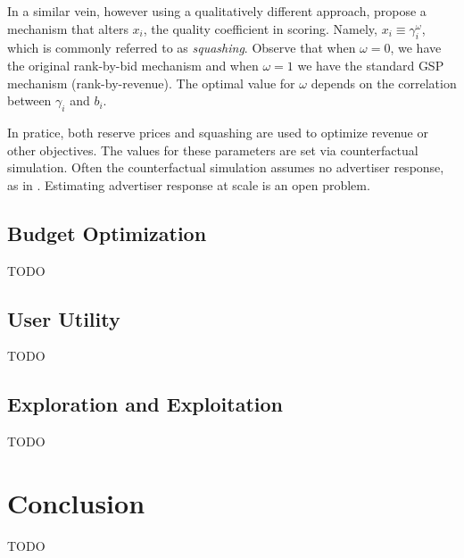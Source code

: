 \documentclass[prodmode,acmtist]{acmsmall} %
\begin{document}
In a similar vein, however using a qualitatively different approach,  propose a mechanism that alters $x_i$, the quality coefficient in scoring.
Namely, $x_i \equiv \gamma_i^\omega$, which is commonly referred to as \emph{squashing}.
Observe that when $\omega = 0$, we have the original rank-by-bid mechanism and when $\omega = 1$ we have the standard GSP mechanism (rank-by-revenue).
The optimal value for $\omega$ depends on the correlation between $\gamma_i$ and $b_i$.

In pratice, both reserve prices and squashing are used to optimize revenue or other objectives.
The values for these parameters are set via counterfactual simulation.
Often the counterfactual simulation assumes no advertiser response, as in .
Estimating advertiser response at scale is an open problem.


\subsection{Budget Optimization} %
\label{sub:budget_optimization}

TODO


\subsection{User Utility} %
\label{sub:user_utility}

TODO


\subsection{Exploration and Exploitation} %
\label{sub:exploration_and_exploitation}
TODO


\section{Conclusion} %
\label{sec:conclusion}

TODO





\end{document}
